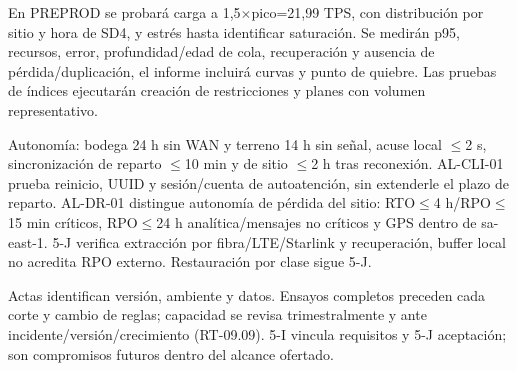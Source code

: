 En PREPROD se probará carga a 1,5\ensuremath{\times}pico=21,99 TPS, con distribución por sitio y hora de SD4, y estrés hasta identificar saturación. Se medirán p95, recursos, error, profundidad/edad de cola, recuperación y ausencia de pérdida/duplicación, el informe incluirá curvas y punto de quiebre. Las pruebas de índices ejecutarán creación de restricciones y planes con volumen representativo.

Autonomía: bodega 24 h sin WAN y terreno 14 h sin señal, acuse local \ensuremath{\leq}2 s, sincronización de reparto \ensuremath{\leq}10 min y de sitio \ensuremath{\le}2 h tras reconexión. AL-CLI-01 prueba reinicio, UUID y sesión/cuenta de autoatención, sin extenderle el plazo de reparto. AL-DR-01 distingue autonomía de pérdida del sitio: RTO\ensuremath{\leq}4 h/RPO\ensuremath{\leq}15 min críticos, RPO\ensuremath{\leq}24 h analítica/mensajes no críticos y GPS dentro de sa-east-1. 5-J verifica extracción por fibra/LTE/Starlink y recuperación, buffer local no acredita RPO externo. Restauración por clase sigue 5-J.

Actas identifican versión, ambiente y datos. Ensayos completos preceden cada corte y cambio de reglas; capacidad se revisa trimestralmente y ante incidente/versión/crecimiento (RT-09.09). 5-I vincula requisitos y 5-J aceptación; son compromisos futuros dentro del alcance ofertado.
